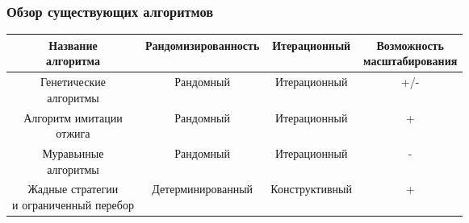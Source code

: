 \begin{frame}
    \frametitle{Обзор существующих алгоритмов}
    {
        \small
        \begin{tabular}{ c | c | c | c  }
            \makecell{Название          \\алгоритма} & Рандомизированность & Итерационный & \makecell{Возможность \\ масштабирования} \\
            \hline
            \makecell{Генетические      \\алгоритмы} & Рандомный & Итерационный & +/- \\
            \makecell{Алгоритм имитации \\отжига} & Рандомный & Итерационный & + \\
            \makecell{Муравьиные        \\алгоритмы} & Рандомный & Итерационный & - \\
            \makecell{Жадные стратегии  \\и ограниченный перебор} & Детерминированный & Конструктивный & + \\
        \end{tabular}
    }
\end{frame}